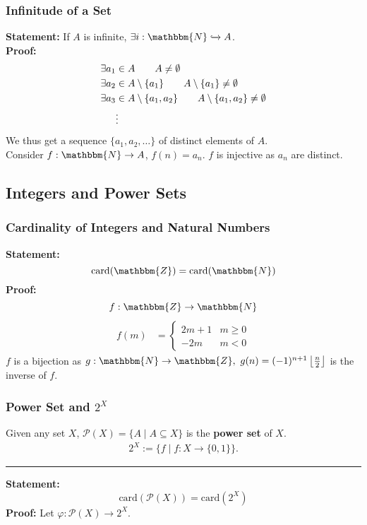 \documentclass[10pt]{extarticle}
\begin{document}
      \subsubsection{Infinitude of a Set}%
      \textbf{Statement:} If $A$ is infinite, $\exists i: \mathbbm{N} \xhookrightarrow{} A$.\\

      \textbf{Proof:}
      \begin{align*}
        \exists a_1&\in A \tag*{$A\neq \emptyset$}\\
        \exists a_2 &\in A\setminus \{a_1\} \tag*{$A\setminus \{a_1\} \neq \emptyset$}\\
        \exists a_3&\in A\setminus \{a_1,a_2\} \tag*{$A \setminus \{a_1,a_2\} \neq \emptyset$}\\
                   &\vdots
      \end{align*}
      We thus get a sequence $\{a_1,a_2,\dots\}$ of distinct elements of $A$.\\

      Consider $f:\mathbbm{N} \rightarrow A$, $f(n) = a_n$. $f$ is injective as $a_n$ are distinct.\\
    \subsection{Integers and Power Sets}%
    \subsubsection{Cardinality of Integers and Natural Numbers}%
    \textbf{Statement:}
      \[
        \text{card}(\mathbbm{Z}) = \text{card}(\mathbbm{N})
      \] 
      \textbf{Proof:}
      \[
        f:\mathbbm{Z} \rightarrow \mathbbm{N}
      \] 
      \begin{align*}
        f(m) &= \begin{cases}
          2m + 1 & m\geq 0\\
          -2m & m<0
        \end{cases}
      \end{align*}
      $f$ is a bijection as $g:\mathbbm{N} \rightarrow \mathbbm{Z},~g(n) = (-1)^{n+1}\left\lfloor \frac{n}{2}\right\rfloor$ is the inverse of $f$.\\
      \subsubsection{Power Set and $2^{X}$}%
      Given any set $X$, $\mathcal{P}(X) = \{A \mid A\subseteq X\}$ is the \textbf{power set} of $X$.
      \begin{align*}
        2^X:= \{f\mid f:X\rightarrow \{0,1\}\}.
      \end{align*}
      \begin{center}
        \rule{0.5\textwidth}{0.4pt}
      \end{center}
      \textbf{Statement:}
      \[
        \text{card}(\mathcal{P}(X)) = \text{card}(2^X)
      \] 
      \textbf{Proof:} Let $\varphi: \mathcal{P}(X) \rightarrow 2^X$.\\
\end{document}
